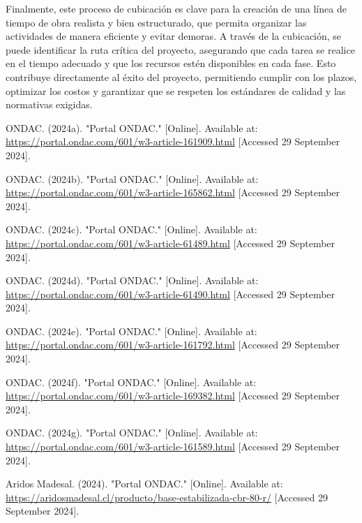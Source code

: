 \documentclass{article} %
\begin{document}
Finalmente, este proceso de cubicación es clave para la creación de una línea de tiempo de obra realista y bien estructurado, que permita organizar las actividades de manera eficiente y evitar demoras. A través de la cubicación, se puede identificar la ruta crítica del proyecto, asegurando que cada tarea se realice en el tiempo adecuado y que los recursos estén disponibles en cada fase. Esto contribuye directamente al éxito del proyecto, permitiendo cumplir con los plazos, optimizar los costos y garantizar que se respeten los estándares de calidad y las normativas exigidas.

\newpage

\begin{thebibliography}{}

    ONDAC. (2024a). "Portal ONDAC." [Online]. Available at: \url{https://portal.ondac.com/601/w3-article-161909.html} [Accessed 29 September 2024].
    
    ONDAC. (2024b). "Portal ONDAC." [Online]. Available at: \url{https://portal.ondac.com/601/w3-article-165862.html} [Accessed 29 September 2024].
    
    ONDAC. (2024c). "Portal ONDAC." [Online]. Available at: \url{https://portal.ondac.com/601/w3-article-61489.html} [Accessed 29 September 2024].
    
    ONDAC. (2024d). "Portal ONDAC." [Online]. Available at: \url{https://portal.ondac.com/601/w3-article-61490.html} [Accessed 29 September 2024].
    
    ONDAC. (2024e). "Portal ONDAC." [Online]. Available at: \url{https://portal.ondac.com/601/w3-article-161792.html} [Accessed 29 September 2024].
    
    ONDAC. (2024f). "Portal ONDAC." [Online]. Available at: \url{https://portal.ondac.com/601/w3-article-169382.html} [Accessed 29 September 2024].
    
    ONDAC. (2024g). "Portal ONDAC." [Online]. Available at: \url{https://portal.ondac.com/601/w3-article-161589.html} [Accessed 29 September 2024].
    
    Aridos Madesal. (2024). "Portal ONDAC." [Online]. Available at: \url{https://aridosmadesal.cl/producto/base-estabilizada-cbr-80-r/} [Accessed 29 September 2024].
    

\end{thebibliography}
\end{document}
